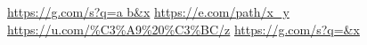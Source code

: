 \documentclass[11pt]{article}
\author{root}
\date{\today}
\title{}
\begin{document}
\tableofcontents

\url{https://g.com/s?q=a b\&x} \url{https://e.com/path/x\_y} \url{https://u.com/\%C3\%A9\%20\%C3\%BC/z} \url{https://g.com/s?q=\&x}
\end{document}
